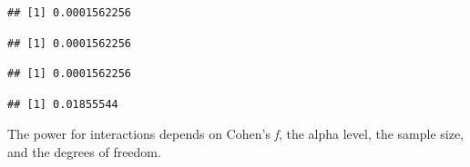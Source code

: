 \documentclass[
]{book}
\newenvironment{Shaded}{\begin{snugshade}}{\end{snugshade}}
\newcommand{\NormalTok}[1]{#1}
\newcommand{\SpecialCharTok}[1]{\textcolor[rgb]{0.00,0.00,0.00}{#1}}
\begin{document}
\begin{verbatim}
## [1] 0.0001562256
\end{verbatim}

\begin{Shaded}
\end{Shaded}

\begin{verbatim}
## [1] 0.0001562256
\end{verbatim}

\begin{Shaded}
\end{Shaded}

\begin{verbatim}
## [1] 0.0001562256
\end{verbatim}

\begin{Shaded}
\end{Shaded}

\begin{verbatim}
## [1] 0.01855544
\end{verbatim}

The power for interactions depends on Cohen's \emph{f}, the alpha level, the sample size, and the degrees of freedom.
\end{document}
